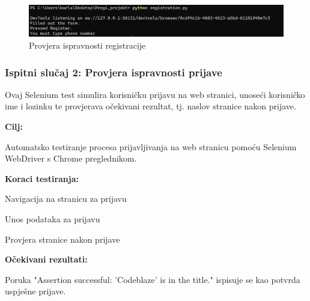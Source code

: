 						\begin{figure} [H]
							\centering
							\includegraphics[width=0.7\linewidth]{slike/RegisterSeleniumOutput.png}
							\caption{Provjera ispravnosti registracije}
							\label{fig:Provjera ispravnosti registracije}
						\end{figure}

                        


            \subsubsection{Ispitni slučaj 2: Provjera ispravnosti prijave}

                        Ovaj Selenium test simulira korisničku prijavu na web stranici, unoseći korisničko ime i lozinku te provjerava očekivani rezultat, tj. naslov stranice nakon prijave.
                        
                        \noindent\textbf{Cilj:}
                        \begin{packed_item}
                        	Automatsko testiranje procesa prijavljivanja na web stranicu pomoću Selenium WebDriver s Chrome preglednikom.
                        \end{packed_item}
                        
                        \noindent\textbf{Koraci testiranja:}
                        \begin{packed_item}
                        	\item Navigacija na stranicu za prijavu
                        	\item  Unos podataka za prijavu
                        	\item Provjera stranice nakon prijave
                        	
                        \end{packed_item}
                        \noindent\textbf{Očekivani rezultati:}
                        \begin{packed_item}
                        	\item  Poruka "Assertion successful: 'Codeblaze' is in the title." ispisuje se kao potvrda uspješne prijave.
                        \end{packed_item}
                                                             

